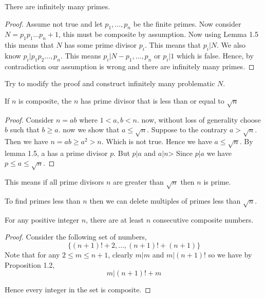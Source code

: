 \begin{theorem}
    There are infinitely many primes.
\end{theorem}
\begin{proof}
    Assume not true and let $p_1,\dots,p_n$ be the finite primes. Now consider $N = p_1p_1\dots p_n + 1$, this must be composite by assumption.  Now using Lemma 1.5 this means that $N$ has some prime divisor $p_i$. This means that  $p_i | N$. We also know  $p_i | p_1p_2\dots,p_n$. This means $p_i | N - p_1,\dots, p_n$ or $p_i | 1$ which is false. Hence, by contradiction our assumption is wrong and there are infinitely many primes.
\end{proof}
\begin{note}
    Try to modify the proof and construct infinitely many problematic $N$. 
\end{note}
\begin{prop}
    If $n$ is composite,  the $n$ has prime divisor that is less than or equal to $\sqrt{n}$
\end{prop}
\begin{proof}
    Consider  $n = ab$ where  $1 < a,b < n$. now, without loss of generality choose  $b$ such that  $b \ge a$. now we show that $a \le \sqrt{n}$. Suppose to the contrary  $a > \sqrt{n}$. Then we have $n = ab \ge a^2 > n$. Which is not true. Hence we have $a \le \sqrt{n}$. By lemma 1.5, a has a prime divisor $p$. But  $p | a$ and  $a | n$> Since  $ p | a$ we have  $ p \le a \le \sqrt{n}$.
\end{proof}

\begin{note}
    This means if all prime divisors  $n$ are greater than  $\sqrt{n}$ then  $n$ is prime.
\end{note}

\begin{eg}
    To find primes less than $n$ then we can delete multiples of primes less than  $\sqrt{n}$.
\end{eg}
\begin{prop}
    For any positive integer $n$, there are at least $n$ consecutive composite numbers.
\end{prop}
\begin{proof}
    Consider the following set of numbers,
    $$ \{(n + 1)! + 2, \dots , (n + 1)! + (n + 1) \} $$ 
    Note that for any $2 \le m \le n + 1$, clearly  $m | m$ and  $m | (n + 1)!$ so we have by Proposition 1.2, $$ m | (n + 1)! + m$$

     Hence every integer in the set is composite.
\end{proof}


